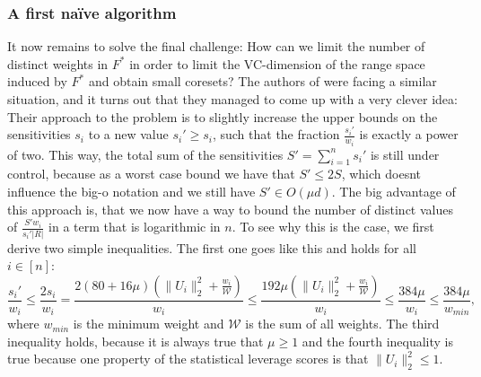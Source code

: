 \subsubsection{A first na\"ive algorithm}
\label{sec:naive-algorihtm}

It now remains to solve the final challenge: How can we limit the
number of distinct weights in $F^\ast$ in order to limit
the VC-dimension of the range space induced by $F^\ast$ and obtain
small coresets? The authors of \cite{on-coresets} were facing
a similar situation, and it turns out that they managed to come
up with a very clever idea: Their approach to the problem is to
slightly increase the upper bounds on the sensitivities $s_i$ to
a new value $s_i' \geq s_i$, such that the fraction $\frac{s_i'}{w_i}$ is
exactly a power of two. This way, the total sum of the sensitivities
$S' = \sum_{i=1}^n s_i'$ is still under control, because as a worst
case bound we have that $S' \leq 2 S$, which doesnt influence the
big-o notation and we still have $S' \in O(\mu d)$.
The big advantage of this approach is, that we now have a way
to bound the number of distinct values of $\frac{S'w_i}{s_i' |R|}$
in a term that is logarithmic in $n$.
To see why this is the case, we first derive two simple
inequalities. The first one goes like this and holds for all
$i \in [n]$:
\begin{equation*}
    \frac{s_i'}{w_i} \leq \frac{2 s_i}{w_i}
    = \frac{2 (80 + 16\mu)(\lVert U_i \rVert_2^2 + \frac{w_i}{\mathcal{W}})}{w_i}
    \leq \frac{192\mu (\lVert U_i \rVert_2^2 + \frac{w_i}{\mathcal{W}})}{w_i}
    \leq \frac{384 \mu}{w_i}
    \leq \frac{384 \mu}{w_{min}},
\end{equation*}
where $w_{min}$ is the minimum weight and $\mathcal{W}$ is the sum
of all weights. The third inequality holds, because it is
always true that $\mu \geq 1$ and the fourth inequality is true because
one property of the statistical leverage scores
is that $\lVert U_i \rVert_2^2 \leq 1$.

